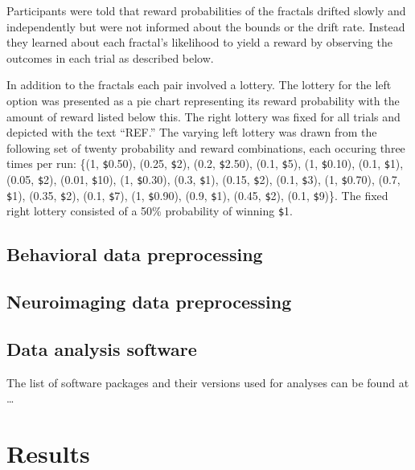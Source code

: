 \documentclass[
  english,
  man]{apa6}
\begin{document}
Participants were told that reward probabilities of the fractals drifted slowly and independently but were not informed about the bounds or the drift rate. Instead they learned about each fractal's likelihood to yield a reward by observing the outcomes in each trial as described below.

In addition to the fractals each pair involved a lottery. The lottery for the left option was presented as a pie chart representing its reward probability with the amount of reward listed below this. The right lottery was fixed for all trials and depicted with the text ``REF.'' The varying left lottery was drawn from the following set of twenty probability and reward combinations, each occuring three times per run: \{(1, \texttt{\$}0.50), (0.25, \texttt{\$}2), (0.2, \texttt{\$}2.50), (0.1, \texttt{\$}5), (1, \texttt{\$}0.10), (0.1, \texttt{\$}1), (0.05, \texttt{\$}2), (0.01, \texttt{\$}10), (1, \texttt{\$}0.30), (0.3, \texttt{\$}1), (0.15, \texttt{\$}2), (0.1, \texttt{\$}3), (1, \texttt{\$}0.70), (0.7, \texttt{\$}1), (0.35, \texttt{\$}2), (0.1, \texttt{\$}7), (1, \texttt{\$}0.90), (0.9, \texttt{\$}1), (0.45, \texttt{\$}2), (0.1, \texttt{\$}9)\}. The fixed right lottery consisted of a 50\% probability of winning \texttt{\$}1.

\hypertarget{behavioral-data-preprocessing}{%
\subsection{Behavioral data preprocessing}\label{behavioral-data-preprocessing}}

\hypertarget{neuroimaging-data-preprocessing}{%
\subsection{Neuroimaging data preprocessing}\label{neuroimaging-data-preprocessing}}

\hypertarget{data-analysis-software}{%
\subsection{Data analysis software}\label{data-analysis-software}}

The list of software packages and their versions used for analyses can be found at \ldots{}

\hypertarget{results}{%
\section{Results}\label{results}}
\end{document}
